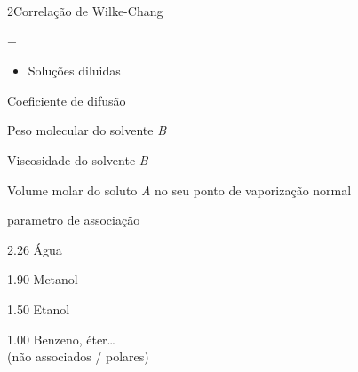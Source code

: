 \documentclass[\mainfilename]{subfiles}
\begin{document}
\begin{sectionBox}2{Correlação de Wilke-Chang} %
    
    \begin{BM}
        = 
    \end{BM}

    \begin{itemize}
        \item Soluções diluidas
    \end{itemize}
    \begin{description}[
        leftmargin=!,
        labelwidth=\widthof{\(\dim\mu_B=\unit{\centi\poise}=\qty*{0.1}{\centi\pascal.\second}\)} %
    ]
       \item[\(\dim{D}=\unit{\centi\metre^3/\second}\)] Coeficiente de difusão
       \item[\(\dim{M_B}=\unit{\gram\of{B}/\mole}\)] Peso molecular do solvente \textit{B}
       \item[\(\dim\mu_B=\unit{\centi\poise}=\qty*{0.1}{\centi\pascal.\second}\)] Viscosidade do solvente \textit{B}
       \item[\(\dim{V_{A}}=\unit{\centi\metre^3.\mole^{-1}}\)] Volume molar do soluto \textit{A} no seu ponto de vaporização normal
       \item[\(\dim\Phi_B=0\)] parametro de associação
       \vspace{-2ex}
       \begin{itemize}
            \begin{multicols}{2}
                \item 2.26 \to{} Água
                \item 1.90 \to{} Metanol
                \item 1.50 \to{} Etanol
                \item 1.00 \to{} Benzeno, éter\dots\\(não associados / polares)
            \end{multicols}
       \end{itemize}
    \end{description}
    
\end{sectionBox}
\end{document}
